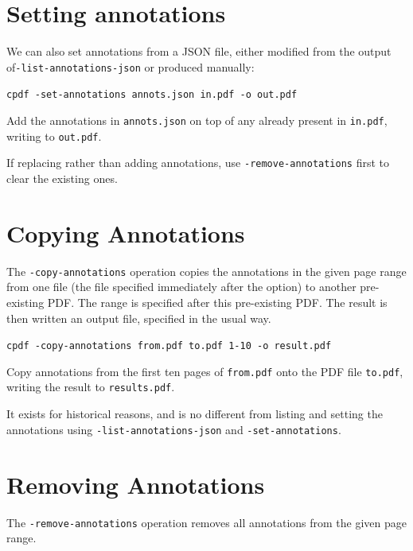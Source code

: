 \documentclass{book}
\begin{document}
\section{Setting annotations}

We can also set annotations from a JSON file, either modified from the output of\linebreak \texttt{-list-annotations-json} or produced manually:

  \begin{framed}
    \noindent\small\verb!cpdf -set-annotations annots.json in.pdf -o out.pdf !
    
    \vspace{2.5mm}
    \noindent Add the annotations in \texttt{annots.json} on top of any already present in \texttt{in.pdf}, writing to \texttt{out.pdf}.

  \end{framed}

\noindent If replacing rather than adding annotations, use \texttt{-remove-annotations} first to clear the existing ones.


  \section{Copying Annotations}
  The \texttt{-copy-annotations} operation copies the annotations in the given
page range from one file (the file specified immediately after the option) to
another pre-existing PDF. The range is specified after this pre-existing PDF.
The result is then written an output file, specified in the usual way.

  \begin{framed}
    \noindent\small\verb!cpdf -copy-annotations from.pdf to.pdf 1-10 -o result.pdf !
    
    \vspace{2.5mm}
    \noindent Copy annotations from the first ten pages of \texttt{from.pdf}
onto the PDF file \texttt{to.pdf}, writing the result to \texttt{results.pdf}.

  \end{framed}

\noindent It exists for historical reasons, and is no different from listing and setting the annotations using \texttt{-list-annotations-json} and \texttt{-set-annotations}. 

  \section{Removing Annotations}
  The \texttt{-remove-annotations} operation removes all annotations from the
given page range.
\end{document}
